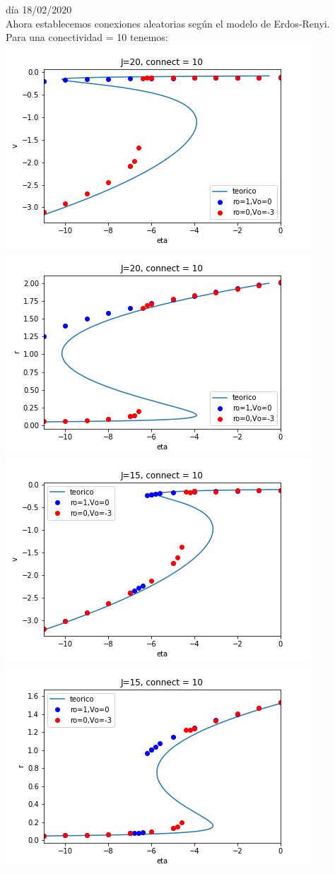 \documentclass[a4paper]{article}
\begin{document}
día 18/02/2020\\
Ahora establecemos conexiones aleatorias según el modelo de Erdos-Renyi.\\
Para una conectividad = 10 tenemos:\\
\includegraphics[scale=0.7]{v_vs_eta_J20_con10.png}\\
\includegraphics[scale=0.7]{r_vs_eta_J20_con10.png}\\
\includegraphics[scale=0.7]{v_vs_eta_J15_con10.png}\\
\includegraphics[scale=0.7]{r_vs_eta_J15_con10.png}\\
\end{document}
